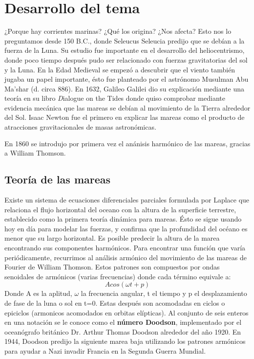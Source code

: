 \documentclass[12pt]{article}
\begin{document}
        \section{Desarrollo del tema}
\noindent ¿Porque hay corrientes marinas? ¿Qué los origina? ¿Nos afecta? Esto nos lo preguntamos desde 150 B.C., donde Seleucus Seleucia predijo que se deb\'ian a la fuerza de la Luna. Su estudio fue importante en el desarrollo del heliocentrismo, donde poco tiempo despu\'es pudo ser relacionado con fuerzas gravitatorias del sol y la Luna. En la Edad Medieval se empez\'o a descubrir que el viento tambi\'en jugaba un papel importante, \'esto fue planteado por el astr\'onomo Musulman Abu Ma'shar (d. circa 886). En 1632, Galileo Galilei dio su explicaci\'on mediante una teor\'ia en su libro {\textit Dialogue on the Tides} donde quiso comprobar mediante evidencia mec\'anica que las mareas se deb\'ian al movimiento de la Tierra alrededor del Sol. Isaac Newton fue el primero en explicar las mareas como el producto de atracciones gravitacionales de masas astronómicas. 

En 1860 se introdujo por primera vez el an\'anisis harm\'onico de las mareas, gracias a William Thomson. 

\subsection*{Teor\'ia de las mareas \small{\cite{b}}}
Existe un sistema de ecuaciones diferenciales parciales formulada por Laplace que relaciona el flujo horizontal del oceano con la altura de la superficie terrestre, establecido como la primera teoría dinámica para mareas. \'Esto se sigue usando hoy en d\'ia para modelar las fuerzas, y confirma que la profundidad del océano es menor que su largo horizontal. Es posible predecir la altura de la marea encontrando sus componentes harmónicos. Para encontrar una función que varía periódicamente, recurrimos al análisis armónico del movimiento de las mareas de Fourier de William Thomson\cite{c}. Estos patrones son compuestos por ondas senoidales de armónicos (varias frecuencias) donde cada término equivale a:
\begin{equation}
A cos(\omega t+p)
\end{equation}
Donde A es la aplitud, $\omega$ la frecuencia angular, t el tiempo y p el desplazamiento de fase de la luna o sol en t=0. Estas despu\'es son acomodadas en ciclos o epiciclos (armonicos acomodados en orbitas el\'ipticas). Al conjunto de seis enteros en una notaci\'on se le conoce como el \textbf{n\'umero Doodson}, implementado por el ocean\'ografo brit\'anico Dr. Arthur Thomas Doodson alrededor del año 1920. En 1944, Doodson predijo la siguiente marea baja utilizando los patrones armónicos para ayudar a Nazi invadir Francia en la Segunda Guerra Mundial\cite{d}. 
\end{document}
